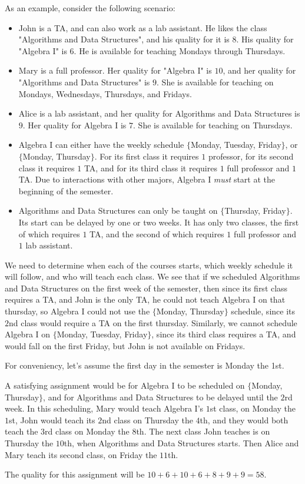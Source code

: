 As an example, consider the following scenario:
\begin{itemize}
\item John is a TA, and can also work as a lab assistant. He likes the class "Algorithms and Data Structures", and his quality for it is $8$. His quality for "Algebra I" is $6$. He is available for teaching Mondays through Thursdays.
\item Mary is a full professor. Her quality for "Algebra I" is $10$, and her quality for "Algorithms and Data Structures" is $9$. She is available for teaching on Mondays, Wednesdays, Thursdays, and Fridays.
\item Alice is a lab assistant, and her quality for Algorithms and Data Structures is $9$. Her quality for Algebra I is $7$. She is available for teaching on Thursdays.
\item Algebra I can either have the weekly schedule $\{$Monday, Tuesday, Friday$\}$, or $\{$Monday, Thursday$\}$. For its first class it requires $1$ professor, for its second class it requires $1$ TA, and for its third class it requires $1$ full professor and $1$ TA. Due to interactions with other majors, Algebra I \emph{must} start at the beginning of the semester.
\item Algorithms and Data Structures can only be taught on $\{$Thursday, Friday$\}$. Its start can be delayed by one or two weeks. It has only two classes, the first of which requires $1$ TA, and the second of which requires $1$ full professor and $1$ lab assistant.
\end{itemize}

We need to determine when each of the courses starts, which weekly schedule it will follow, and who will teach each class. We see that if we scheduled Algorithms and Data Structures on the first week of the semester, then since its first class requires a TA, and John is the only TA, he could not teach Algebra I on that thursday, so Algebra I could not use the $\{$Monday, Thursday$\}$ schedule, since its $2$nd class would require a TA on the first thursday. Similarly, we cannot schedule Algebra I on $\{$Monday, Tuesday, Friday$\}$, since its third class requires a TA, and would fall on the first Friday, but John is not available on Fridays.

For conveniency, let's assume the first day in the semester is Monday the 1st.

A satisfying assignment would be for Algebra I to be scheduled on $\{$Monday, Thursday$\}$, and for Algorithms and Data Structures to be delayed until the $2$rd week. In this scheduling, Mary would teach Algebra I's $1$st class, on Monday the $1$st, John would teach its $2$nd class on Thursday the $4$th, and they would both teach the $3$rd class on Monday the $8$th. The next class John teaches is on Thursday the $10$th, when Algorithms and Data Structures starts. Then Alice and Mary teach its second class, on Friday the $11$th.

The quality for this assignment will be $10 + 6 + 10 + 6 + 8 + 9 + 9 = 58$.
